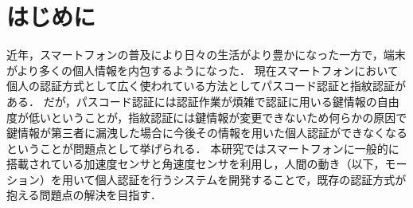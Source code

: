\section{はじめに}
近年，スマートフォンの普及により日々の生活がより豊かになった一方で，端末がより多くの個人情報を内包するようになった．
現在スマートフォンにおいて個人の認証方式として広く使われている方法としてパスコード認証と指紋認証がある．
だが，パスコード認証には認証作業が煩雑で認証に用いる鍵情報の自由度が低いということが，指紋認証には鍵情報が変更できないため何らかの原因で鍵情報が第三者に漏洩した場合に今後その情報を用いた個人認証ができなくなるということが問題点として挙げられる．
本研究ではスマートフォンに一般的に搭載されている加速度センサと角速度センサを利用し，人間の動き（以下，モーション）を用いて個人認証を行うシステムを開発することで，既存の認証方式が抱える問題点の解決を目指す．
